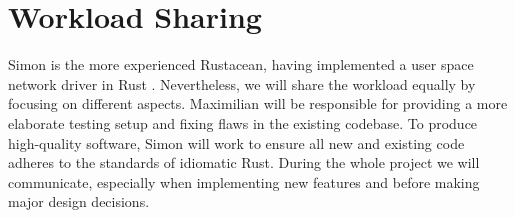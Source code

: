 \documentclass[a4paper, 11pt]{article}
\begin{document}
\section*{Workload Sharing}
Simon is the more experienced Rustacean, having implemented a user space network driver in Rust \cite{Ixy}.
Nevertheless, we will share the workload equally by focusing on different aspects. 
Maximilian will be responsible for providing a more elaborate testing setup and fixing flaws in the existing codebase. 
To produce high-quality software, Simon will work to ensure all new and existing code adheres to the standards of idiomatic Rust.
During the whole project we will communicate, especially when implementing new features and before making major design decisions.



\end{document}
